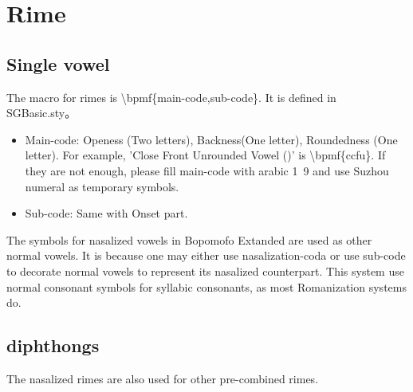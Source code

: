 \section{Rime}
\subsection{Single vowel}
The macro for rimes is {\textbackslash}bpmf\{main-code,sub-code\}. It is defined in SGBasic.sty。\par
\begin{itemize}
	\item Main-code: Openess (Two letters), Backness(One letter), Roundedness (One letter). For example, 'Close Front Unrounded Vowel ()' is {\textbackslash}bpmf\{ccfu\}. If they are not enough, please fill main-code with arabic 1~9 and use Suzhou numeral as temporary symbols. 
	\item Sub-code: Same with Onset part. 
\end{itemize}
The symbols for nasalized vowels in Bopomofo Extanded are used as other normal vowels. It is because one may either use nasalization-coda or use sub-code to decorate normal vowels to represent its nasalized counterpart. This system use normal consonant symbols for syllabic consonants, as most Romanization systems do. \par


\subsection{diphthongs}
The nasalized rimes are also used for other pre-combined rimes. \par
{}%

\clearpage